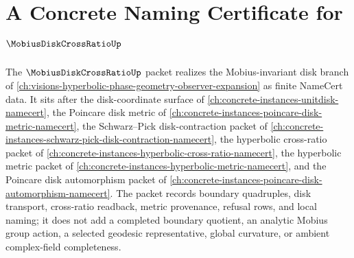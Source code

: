 \chapter{A Concrete Naming Certificate for $\MobiusDiskCrossRatioUp$}
\label{ch:concrete-instances-mobius-disk-cross-ratio-namecert}

The $\MobiusDiskCrossRatioUp$ packet realizes the Mobius-invariant disk branch of \autoref{ch:visions-hyperbolic-phase-geometry-observer-expansion} as finite NameCert data. It sits after the disk-coordinate surface of \autoref{ch:concrete-instances-unitdisk-namecert}, the Poincare disk metric of \autoref{ch:concrete-instances-poincare-disk-metric-namecert}, the Schwarz--Pick disk-contraction packet of \autoref{ch:concrete-instances-schwarz-pick-disk-contraction-namecert}, the hyperbolic cross-ratio packet of \autoref{ch:concrete-instances-hyperbolic-cross-ratio-namecert}, the hyperbolic metric packet of \autoref{ch:concrete-instances-hyperbolic-metric-namecert}, and the Poincare disk automorphism packet of \autoref{ch:concrete-instances-poincare-disk-automorphism-namecert}. The packet records boundary quadruples, disk transport, cross-ratio readback, metric provenance, refusal rows, and local naming; it does not add a completed boundary quotient, an analytic Mobius group action, a selected geodesic representative, global curvature, or ambient complex-field completeness.

